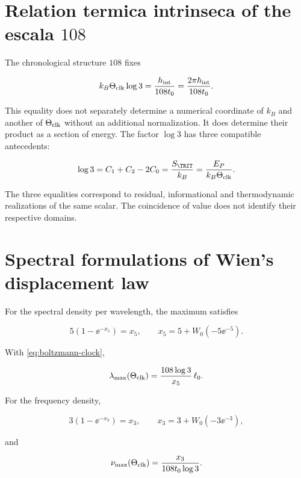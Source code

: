 \section{Relation termica intrinseca of the escala \(108\)}

The chronological structure \(108\) fixes

\begin{equation}
k_B\Theta_{\rm clk}\log3
=\frac{h_{\rm int}}{108t_0}
=\frac{2\pi\hbar_{\rm int}}{108t_0}.
\label{eq:boltzmann-clock}
\end{equation}

This equality does not separately determine a numerical coordinate of \(k_B\) and another of \(\Theta_{\rm clk}\) without an additional normalization. It does determine their product as a section of energy. The factor \(\log3\) has three compatible antecedents:

\begin{equation}
\log3=C_1+C_2-2C_0
=\frac{S_{\TRIT}}{k_B}
=\frac{E_P}{k_B\Theta_{\rm clk}}.
\label{eq:log3-triple}
\end{equation}

The three equalities correspond to residual, informational and
thermodynamic realizations of the same scalar. The coincidence of value does not identify
their respective domains.

\section{Spectral formulations of Wien's displacement law}

For the spectral density per wavelength, the maximum satisfies

\[
5(1-\ee^{-x_5})=x_5,
\qquad
x_5=5+W_0(-5\ee^{-5}).
\]

With \cref{eq:boltzmann-clock},

\begin{equation}
\lambda_{\max}(\Theta_{\rm clk})
=\frac{108\log3}{x_5}\,\ell_0.
\label{eq:wien-lambda}
\end{equation}

For the frequency density,

\[
3(1-\ee^{-x_3})=x_3,
\qquad
x_3=3+W_0(-3\ee^{-3}),
\]

and

\begin{equation}
\nu_{\max}(\Theta_{\rm clk})
=\frac{x_3}{108t_0\log3}.
\label{eq:wien-frequency}
\end{equation}


